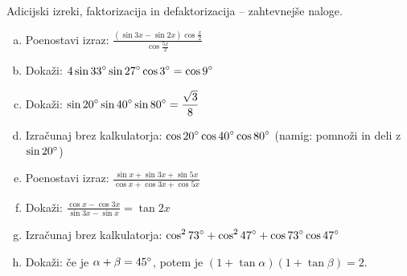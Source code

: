 \documentclass[a4paper,12pt]{letter}
\newcounter{tocke}
\begin{document}
\begin{naloga}[\hfill $\tockeA$] \addtocounter{tocke}{\numexpr\tockeA\relax}
Adicijski izreki, faktorizacija in defaktorizacija -- zahtevnej\v{s}e naloge.
\begin{enumerate}[a)]
\item Poenostavi izraz: $\displaystyle \frac{(\sin3x-\sin2x)\cos\frac{x}{2}}{\cos\frac{5x}{2}}$
\item Doka\v{z}i: $\displaystyle 4\sin33\degree\sin27\degree\cos3\degree=\cos9\degree$
\item Doka\v{z}i: $\displaystyle \sin20\degree\sin40\degree\sin80\degree=\frac{\sqrt3}{8}$
\item Izra\v{c}unaj brez kalkulatorja: $\displaystyle \cos20\degree\cos40\degree\cos80\degree$ \quad (namig: pomno\v{z}i in deli z $\sin20\degree$)
\item Poenostavi izraz: $\displaystyle \frac{\sin x+\sin3x+\sin5x}{\cos x+\cos3x+\cos5x}$
\item Doka\v{z}i: $\displaystyle \frac{\cos x-\cos3x}{\sin3x-\sin x}=\tan2x$
\item Izra\v{c}unaj brez kalkulatorja: $\displaystyle \cos^273\degree+\cos^247\degree+\cos73\degree\cos47\degree$
\item Doka\v{z}i: \v{c}e je $\alpha+\beta=45\degree$, potem je $(1+\tan\alpha)(1+\tan\beta)=2$.
\end{enumerate}
\end{naloga}
\end{document}
